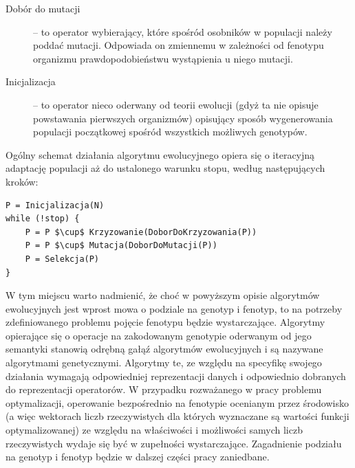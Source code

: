 \documentclass[12pt,a4paper]{report}
\begin{document}
{{{\begin{description}
  \item[Dobór do mutacji] -- to operator wybierający, które spośród osobników w populacji należy poddać mutacji. Odpowiada on zmiennemu w zależności od fenotypu organizmu prawdopodobieństwu wystąpienia u niego mutacji.
  \item[Inicjalizacja] -- to operator nieco oderwany od teorii ewolucji (gdyż ta nie opisuje powstawania pierwszych organizmów) opisujący sposób wygenerowania populacji początkowej spośród wszystkich możliwych genotypów.
\end{description}
}
\par{
Ogólny schemat działania algorytmu ewolucyjnego opiera się o iteracyjną adaptację populacji aż do ustalonego warunku stopu, według następujących kroków:
\lstset{language=C}
\begin{lstlisting}[frame=single,mathescape]
P = Inicjalizacja(N)
while (!stop) {
	P = P $\cup$ Krzyzowanie(DoborDoKrzyzowania(P))
	P = P $\cup$ Mutacja(DoborDoMutacji(P))
	P = Selekcja(P)
}
\end{lstlisting}
}
\par{
W tym miejscu warto nadmienić, że choć w powyższym opisie algorytmów ewolucyjnych jest wprost mowa o podziale na genotyp i fenotyp, to na potrzeby zdefiniowanego problemu pojęcie fenotypu będzie wystarczające. Algorytmy opierające się o operacje na zakodowanym genotypie oderwanym od jego semantyki stanowią odrębną gałąź algorytmów ewolucyjnych i są nazywane algorytmami genetycznymi. Algorytmy te, ze względu na specyfikę swojego działania wymagają odpowiedniej reprezentacji danych i odpowiednio dobranych do reprezentacji operatorów. W przypadku rozważanego w pracy problemu optymalizacji, operowanie bezpośrednio na fenotypie ocenianym przez środowisko (a więc wektorach liczb rzeczywistych dla których wyznaczane są wartości funkcji optymalizowanej) ze względu na właściwości i możliwości samych liczb rzeczywistych wydaje się być w zupełności wystarczające. Zagadnienie podziału na genotyp i fenotyp będzie w dalszej części pracy zaniedbane.
}
}}
\end{document}

